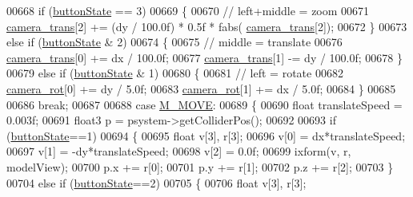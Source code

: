 \begin{DoxyCode}
{{{{{{{00668                         \textcolor{keywordflow}{if} (\hyperlink{particles_8cpp_a5002611f83f5a861df12917dd5651db8}{buttonState} == 3)
00669             \{
00670                 \textcolor{comment}{// left+middle = zoom}
00671                 \hyperlink{particles_8cpp_affab132fdfca08b149d2f866fd486ed4}{camera\_trans}[2] += (dy / 100.0f) * 0.5f * fabs(
      \hyperlink{particles_8cpp_affab132fdfca08b149d2f866fd486ed4}{camera\_trans}[2]);
00672             \}
00673             \textcolor{keywordflow}{else} \textcolor{keywordflow}{if} (\hyperlink{particles_8cpp_a5002611f83f5a861df12917dd5651db8}{buttonState} & 2)
00674             \{
00675                 \textcolor{comment}{// middle = translate}
00676                 \hyperlink{particles_8cpp_affab132fdfca08b149d2f866fd486ed4}{camera\_trans}[0] += dx / 100.0f;
00677                 \hyperlink{particles_8cpp_affab132fdfca08b149d2f866fd486ed4}{camera\_trans}[1] -= dy / 100.0f;
00678             \}
00679             \textcolor{keywordflow}{else} \textcolor{keywordflow}{if} (\hyperlink{particles_8cpp_a5002611f83f5a861df12917dd5651db8}{buttonState} & 1)
00680             \{
00681                 \textcolor{comment}{// left = rotate}
00682                 \hyperlink{particles_8cpp_a9fcb578cacbd3a3b1ab593fc123cffb5}{camera\_rot}[0] += dy / 5.0f;
00683                 \hyperlink{particles_8cpp_a9fcb578cacbd3a3b1ab593fc123cffb5}{camera\_rot}[1] += dx / 5.0f;
00684             \}
00685 
00686             \textcolor{keywordflow}{break};
00687 
00688         \textcolor{keywordflow}{case} \hyperlink{particles_8cpp_a06fc87d81c62e9abb8790b6e5713c55babab1d9d2c1a77a18fc6ae9032fd18057}{M\_MOVE}:
00689             \{
00690                 \textcolor{keywordtype}{float} translateSpeed = 0.003f;
00691                 float3 p = psystem->getColliderPos();
00692 
00693                 \textcolor{keywordflow}{if} (\hyperlink{particles_8cpp_a5002611f83f5a861df12917dd5651db8}{buttonState}==1)
00694                 \{
00695                     \textcolor{keywordtype}{float} v[3], r[3];
00696                     v[0] = dx*translateSpeed;
00697                     v[1] = -dy*translateSpeed;
00698                     v[2] = 0.0f;
00699                     ixform(v, r, modelView);
00700                     p.x += r[0];
00701                     p.y += r[1];
00702                     p.z += r[2];
00703                 \}
00704                 \textcolor{keywordflow}{else} \textcolor{keywordflow}{if} (\hyperlink{particles_8cpp_a5002611f83f5a861df12917dd5651db8}{buttonState}==2)
00705                 \{
00706                     \textcolor{keywordtype}{float} v[3], r[3];
}}}}}}}
\end{DoxyCode}
